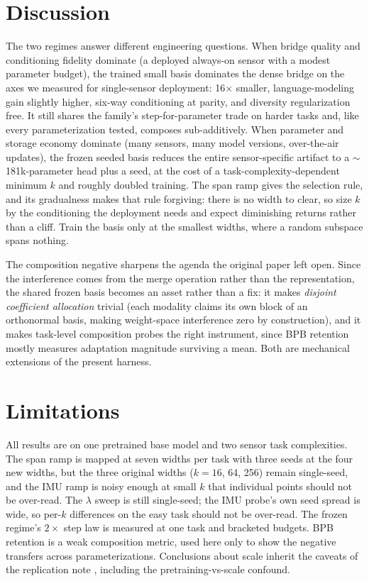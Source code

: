 \documentclass[11pt]{article}
\begin{document}
\section{Discussion}
The two regimes answer different engineering questions. When bridge quality and conditioning fidelity dominate (a deployed always-on sensor with a modest parameter budget), the trained small basis dominates the dense bridge on the axes we measured for single-sensor deployment: 16$\times$ smaller, language-modeling gain slightly higher, six-way conditioning at parity, and diversity regularization free. It still shares the family's step-for-parameter trade on harder tasks and, like every parameterization tested, composes sub-additively. When parameter and storage economy dominate (many sensors, many model versions, over-the-air updates), the frozen seeded basis reduces the entire sensor-specific artifact to a $\sim$181k-parameter head plus a seed, at the cost of a task-complexity-dependent minimum $k$ and roughly doubled training. The span ramp gives the selection rule, and its gradualness makes that rule forgiving: there is no width to clear, so size $k$ by the conditioning the deployment needs and expect diminishing returns rather than a cliff. Train the basis only at the smallest widths, where a random subspace spans nothing.

The composition negative sharpens the agenda the original paper left open. Since the interference comes from the merge operation rather than the representation, the shared frozen basis becomes an asset rather than a fix: it makes \emph{disjoint coefficient allocation} trivial (each modality claims its own block of an orthonormal basis, making weight-space interference zero by construction), and it makes task-level composition probes the right instrument, since BPB retention mostly measures adaptation magnitude surviving a mean. Both are mechanical extensions of the present harness.

\section{Limitations}
All results are on one pretrained base model and two sensor task complexities. The span ramp is mapped at seven widths per task with three seeds at the four new widths, but the three original widths ($k{=}16$, 64, 256) remain single-seed, and the IMU ramp is noisy enough at small $k$ that individual points should not be over-read. The $\lambda$ sweep is still single-seed; the IMU probe's own seed spread is wide, so per-$k$ differences on the easy task should not be over-read. The frozen regime's $2\times$ step law is measured at one task and bracketed budgets. BPB retention is a weak composition metric, used here only to show the negative transfers across parameterizations. Conclusions about scale inherit the caveats of the replication note \cite{penov2026note}, including the pretraining-vs-scale confound.
\end{document}
